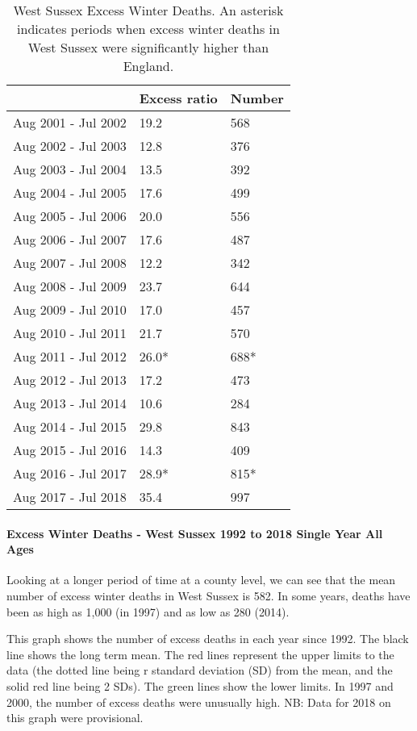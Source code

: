 \begin{table}
    \caption{West Sussex Excess Winter Deaths. An asterisk indicates periods when excess winter deaths in West Sussex were significantly higher than England.}
    \centering
    \begin{tabular}{lll}
        \toprule 
        \ & Excess ratio & Number \\
        \midrule
        Aug 2001 - Jul 2002 & 19.2 & 568 \\
        Aug 2002 - Jul 2003 & 12.8 & 376 \\
        Aug 2003 - Jul 2004 & 13.5 & 392 \\
        Aug 2004 - Jul 2005 & 17.6 & 499 \\
        Aug 2005 - Jul 2006 & 20.0 & 556 \\
        Aug 2006 - Jul 2007 & 17.6 & 487 \\
        Aug 2007 - Jul 2008 & 12.2 & 342 \\
        Aug 2008 - Jul 2009 & 23.7 & 644 \\
        Aug 2009 - Jul 2010 & 17.0 & 457 \\
        Aug 2010 - Jul 2011 & 21.7 & 570 \\
        Aug 2011 - Jul 2012 & 26.0* & 688* \\
        Aug 2012 - Jul 2013 & 17.2 & 473 \\
        Aug 2013 - Jul 2014 & 10.6 & 284 \\
        Aug 2014 - Jul 2015 & 29.8 & 843 \\
        Aug 2015 - Jul 2016 & 14.3 & 409 \\
        Aug 2016 - Jul 2017 & 28.9* & 815* \\
        Aug 2017 - Jul 2018 & 35.4 & 997 \\
        \bottomrule
    \end{tabular}
    \label{tab:op:exwd}
\end{table}
 
\paragraph{Excess Winter Deaths - West Sussex 1992 to 2018 Single Year All Ages} Looking at a longer period of time at a county level, we can see that the mean number of excess winter deaths in West Sussex is 582. In some years, deaths have been as high as 1,000 (in 1997) and as low as 280 (2014).

This graph shows the number of excess deaths in each year since 1992. The black line shows the long term mean. The red lines represent the upper limits to the data (the dotted line being r standard deviation (SD) from the mean, and the solid red line being 2 SDs). The green lines show the lower limits. In 1997 and 2000, the number of excess deaths were unusually high. NB: Data for 2018 on this graph were provisional.

